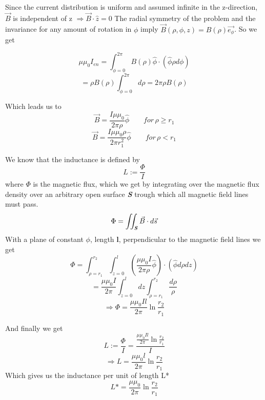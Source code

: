 \documentclass{scrartcl}
\begin{document}
Since the current distribution is uniform and assumed infinite in the z-direction, $\vec{B}$ is independent of z $\Rightarrow \vec{B}\cdot \hat{z}=0$
The radial symmetry of the problem and the invariance for any amount of rotation in $\phi$ imply $\vec{B}(\rho,\phi,z)= B(\rho)\vec{e_{\phi}}$. So we get

\begin{equation}
    \mu\mu_0 I_{en}=\int_{\phi=0}^{2\pi}B(\rho)\hat{\phi}\cdot(\hat{\phi}\rho d\phi)
\end{equation}
\begin{equation}
     =\rho B(\rho) \int_{\phi=0}^{2\pi}d\rho = 2\pi \rho B(\rho)
\end{equation}

Which leads us to
\begin{equation}
   \boxed{\vec{B}=\frac{I\mu\mu_0}{2\pi \rho}\hat{\phi} \qquad for \, \rho \geq r_1}
\end{equation}
\begin{equation}
    \boxed{\vec{B}=\frac{I \mu\mu_0\rho}{2\pi r_1^2}\hat{\phi} \qquad for \, \rho < r_1}
\end{equation}


We know that the inductance is defined by
\begin{equation}
    L:= \frac{\Phi}{I}
\end{equation}
where $\Phi$ is the magnetic flux, which we get by integrating over the magnetic flux density over an arbitrary open surface \textbf{\textit{S}} trough which all magnetic field lines must pass.
\begin{equation}
    \Phi =\iint_{\textbf{\textit{S}}}\vec{B}\cdot d\vec{s}
\end{equation}
With a plane of constant $\phi$, length \textbf{l}, perpendicular to the magnetic field lines we get
\begin{equation}
    \Phi = \int_{\rho=r_1}^{r_2}\int_{z=0}^{l}(\frac{\mu\mu_0 I}{2\pi \rho}\hat{\phi})\cdot(\hat{\phi}d\rho dz)
\end{equation}
\begin{equation}
    =\frac{\mu\mu_0 I}{2\pi}\int_{z=0}^{l}dz\int_{\rho=r_1}^{r_2}\frac{d\rho}{\rho}
\end{equation}
\begin{equation}
   \boxed{\Rightarrow \Phi =\frac{\mu\mu_0 I l }{2\pi}\ln{\frac{r_2}{r_1}}}
\end{equation}

And finally we get
\begin{equation}
    L:=\frac{\Phi}{I} =\frac{\frac{\mu\mu_0 I l}{2\pi}\ln{\frac{r_2}{r_1}}}{I}
\end{equation}
\begin{equation}
    \boxed{\Rightarrow L= \frac{\mu\mu_0 l}{2\pi}\ln{\frac{r_2}{r_1}}}
\end{equation}
Which gives us the inductance per unit of length L*
\begin{equation}
    \boxed{L*=\frac{\mu\mu_0}{2\pi}\ln{\frac{r_2}{r_1}}}
\end{equation}
\end{document}
